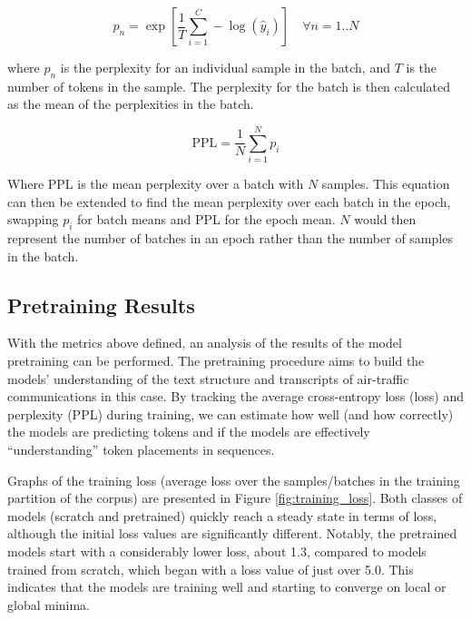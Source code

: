 \documentclass[12pt]{article}
\begin{document}
\begin{equation}\label{eq:perplexity}
    p_n = \exp \left[ \frac{1}{T}\sum_{i=1}^C - \log(\hat{y}_i) \right] \quad \forall n = 1..N
\end{equation}

\noindent
where $p_n$ is the perplexity for an individual sample in the batch, and $T$ is the number of tokens in the sample. The perplexity for the batch is
then calculated as the mean of the perplexities in the batch.

\begin{equation}\label{eq:perplexity_mean}
    \mbox{PPL} = \frac{1}{N}\sum_{i=1}^{N}p_i
\end{equation}

\noindent
Where $\mbox{PPL}$ is the mean perplexity over a batch with $N$ samples. This equation can then be extended to find the mean perplexity over each
batch in the epoch, swapping $p_i$ for batch means and $\mbox{PPL}$ for the epoch mean. $N$ would then represent the number of batches in an epoch
rather than the number of samples in the batch.

\subsection{Pretraining Results}\label{sec:pretraining_results}
With the metrics above defined, an analysis of the results of the model pretraining can be performed. The pretraining procedure aims to build the models' understanding of the text structure and transcripts of air-traffic communications in this case. By tracking the average cross-entropy loss (loss) and perplexity (PPL) during training, we can estimate how well (and how correctly) the models are predicting tokens and if the models are effectively ``understanding'' token placements in sequences.

Graphs of the training loss (average loss over the samples/batches in the training partition of the corpus) are presented in Figure \ref{fig:training_loss}. Both classes of models (scratch and pretrained) quickly reach a steady state in terms of loss, although the initial loss values are significantly different. Notably, the pretrained models start with a considerably lower loss, about 1.3, compared to models trained from scratch, which began with a loss value of just over 5.0. This indicates that the models are training well and starting to converge on local or global minima.
\end{document}

